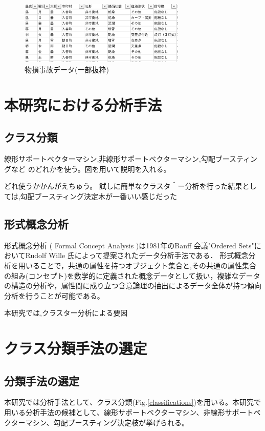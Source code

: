 \documentclass[a4j,8.5pt, twocolumn,fleqn]{jbook}
\begin{document}
\begin{figure}[htb]
\centering
\includegraphics[height=30mm]{images/bussoxn.eps}
\caption{物損事故データ(一部抜粋)}
\label{物損事故データ}
\end{figure}

\section{本研究における分析手法}
\subsection{クラス分類}
線形サポートベクターマシン,非線形サポートベクターマシン,勾配ブースティングなど
のどれかを使う。図を用いて説明を入れる。

どれ使うかかんがえちゅう。
試しに簡単なクラスタ＾ー分析を行った結果としては,勾配ブースティング決定木が一番いい感じだった

\subsection{形式概念分析}
形式概念分析 ( Formal Concept Analysis )は1981年のBanff 会議"Ordered Sets"においてRudolf Wille 氏によって提案されたデータ分析手法である\cite{literature2}．
形式概念分析を用いることで，共通の属性を持つオブジェクト集合と,その共通の属性集合の組み(コンセプト)を数学的に定義された概念データとして扱い，複雑なデータの構造の分析や，属性間に成り立つ含意論理の抽出によるデータ全体が持つ傾向分析を行うことが可能である。

本研究では,クラスター分析による要因


\section{クラス分類手法の選定}
\subsection{分類手法の選定}
本研究では分析手法として、クラス分類(Fig.\ref{classifications})を用いる。本研究で用いる分析手法の候補として、線形サポートベクターマシン、非線形サポートベクターマシン、勾配ブースティング決定枝が挙げられる。
\end{document}
